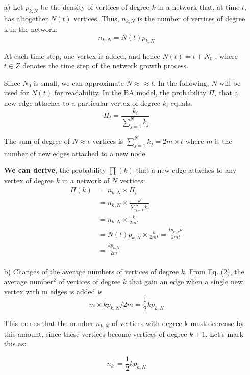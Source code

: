 \documentclass[a4paper,12pt]{article}
\begin{document}
\begin{itemize}
\item[a) ] Let $p_{k,N}$ be the density of vertices of degree $k$ in a network that, at time $t$,
  has altogether $N(t)$ vertices. Thus, $n_{k,N}$  is the number of vertices of degree k in
the network:
$$n_{k,N} = N(t) p_{k,N}$$

At each time step, one vertex is added, and hence $N(t) = t + N_0$ , where
$t \in Z$ denotes the time step of the network growth process.

Since $N_0$ is small, we can
approximate $N \approx ≈ t$. In the following, $N$ will be used for $N(t)$ for readability.
In the BA model, the probability $\Pi_i$ that a new edge attaches to a particular vertex of
degree $k_i$ equals:
\begin{equation} \Pi_i = \frac{k_i}{\sum_{j=1}^N k_j} \end{equation}

The sum of degree of $N \approx t$ vertices is $\sum_{j=1}^N k_j = 2m \times t$ where $m$ is the number of new edges attached to a new node.

\textbf{We can derive}, the probability $\prod(k)$ that a new edge attaches
to any vertex of degree $k$ in a network of $N$ vertices:
\begin{equation}
  \begin{split}
    \Pi (k) & = n_{k,N} \times \Pi_i\\
    & = n_{k,N} \times \frac{k}{\sum_{j=1}^N k_j}\\
    & = n_{k,N} \times \frac{k}{2mt} \\
    & = N(t) p_{k,N} \times \frac{k}{2mt} = \frac{t p_{k,N}k}{2mt}\\
    & =  \frac{k p_{k,N}}{2m}\\ 
  \end{split}
\end{equation}

\item[b) ] Changes of the average numbers of vertices of degree $k$.
  From Eq. (2), the average number$^2$ of vertices of degree $k$ that gain
  an edge when a single new vertex with m edges is added is
  $$m \times kp_{k,N}/2m = \frac{1}{2} kp_{k,N}$$

This means that the number $n_{k,N}$ of vertices with degree k must decrease by this amount,
since these vertices become vertices of degree $k + 1$. Let’s mark this as:

\begin{equation}
n_k^- = \frac{1}{2}kp_{k,N}
\end{equation}


\end{itemize}
\end{document}
